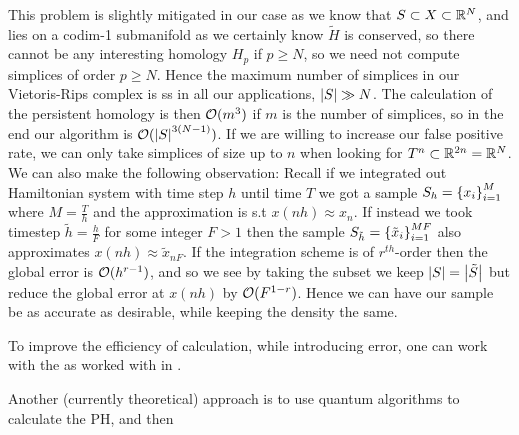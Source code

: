 \documentclass{article}
\begin{document}
This problem is slightly mitigated in our case as we know that $S \subset X \subset \mathbb{R}^N$, and lies on a codim-1 submanifold as we certainly know $\tilde{H}$ is conserved, so there cannot be any interesting homology $H_p$ if $p \geq N$, so we need not compute simplices of order $p \geq N$. Hence the maximum number of simplices in our Vietoris-Rips complex is 
ss in all our applications, $\left\lvert S \right\rvert \gg N$. The calculation of the persistent homology is then $\mathcal{O}(m^3)$ if $m$ is the number of simplices, so in the end our algorithm is $\mathcal{O}(\left\lvert S \right\rvert^{3(N-1)})$. If we are willing to increase our false positive rate, we can only take simplices of size up to $n$ when looking for $T^n \subset \mathbb{R}^{2n}=\mathbb{R}^N$.\\
We can also make the following observation: Recall if we integrated out Hamiltonian system with time step $h$ until time $T$ we got a sample $S_h = \left\{ x_i \right\}_{i=1}^M$ where $M = \frac{T}{h}$ and the approximation is s.t $x(nh) \approx x_n$. If instead we took timestep $\tilde{h} = \frac{h}{F}$ for some integer $F>1$ then the sample $S_{\tilde{h}} = \left\{ \tilde{x}_i \right\}_{i=1}^{MF}$ also approximates $x(nh) \approx \tilde{x}_{nF}$. If the integration scheme is of $r^{th}$-order then the global error is $\mathcal{O}(h^{r-1})$, and so we see by taking the subset 
we keep $\left\lvert S \right\rvert= \left\lvert \tilde{S} \right\rvert$ but reduce the global error at $x(nh)$ by $\mathcal{O}(F^{1-r})$. Hence we can have our sample be as accurate as desirable, while keeping the density the same.
\begin{remark}
To improve the efficiency of calculation, while introducing error, one can work with the  as worked with in \cite{Cavanna2015}.
\end{remark}
Another (currently theoretical) approach is to use quantum algorithms to calculate the PH, and then 


\end{document}
